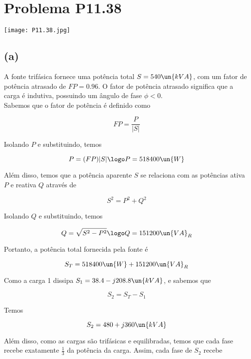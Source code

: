
\section*{Problema P11.38}

\renewcommand*\thesection{11.38}

\begin{center}
    \texttt{[image: P11.38.jpg]}
\end{center}

\subsection*{(a)}

A fonte trifásica fornece uma potência total $S = 540 \un{kVA}$, com um fator de potência atrasado de $FP = 0.96$. 
O fator de potência atrasado significa que a carga é indutiva, possuindo um ângulo de fase $\phi < 0$. \\
Sabemos que o fator de potência é definido como   

\begin{equation}\label{eq:11.38.1}
    FP = \frac{P}{ |S| }
\end{equation}

Isolando $P$ e substituindo, temos   

\[ P = (FP)|S| \logo P = 518400 \un{W} \]

Além disso, temos que a potência aparente $S$ se relaciona com as potências ativa $P$ e reativa $Q$ através de

\begin{equation}\label{eq:11.38.2}
    S^2 = P^2 + Q^2
\end{equation}

Isolando $Q$ e substituindo, temos

\[ Q = \sqrt{S^2 - P^2} \logo Q = 151200 \un{VA}_R \]

Portanto, a potência total fornecida pela fonte é

\[ S_T = 518400 \un{W} + 151200 \un{VA}_R \]

Como a carga 1 dissipa $S_1 = 38.4 -j208.8 \un{kVA}$, e sabemos que

\[ S_2 = S_T - S_1 \]

Temos 

\[ S_2 = 480 + j360 \un{kVA} \]

Além disso, como as cargas são trifásicas e equilibradas, temos que cada fase recebe exatamente $\frac{1}{3}$ da potência da carga.
Assim, cada fase de $S_2$ recebe 

